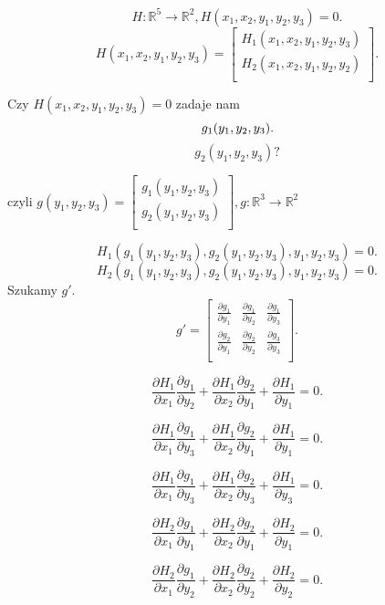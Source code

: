 \documentclass[../main.tex]{subfiles}
\begin{document}
    \[
        H: \mathbb{R}^{5}\to\mathbb{R}^{2}, H(x_{1},x_{2},y_{1},y_{2},y_{3}) = 0
    .\]
    \[
        H(x_{1},x_{2},y_{1},y_{2},y_{3}) = \begin{bmatrix}
        H_1(x_{1},x_{2},y_{1},y_{2},y_{3})\\
    H_2(x_1,x_2,y_1,y_2,y_2)\\\end{bmatrix}
    .\]
    \begin{pytanie}
        Czy $H(x_1,x_2,y_1,y_2,y_3) = 0$ zadaje nam \[
            g_1(y_1,y_2,y_3)\\
        .\]
        \[
            g_2(y_1,y_2,y_3)?
        \]
    \end{pytanie}
    czyli $g(y_1,y_2,y_3) = \begin{bmatrix}
    g_1(y_1,y_2,y_3)\\
g_2(y_1,y_2,y_3)\\\end{bmatrix}, g:\mathbb{R}^{3}\to\mathbb{R}^{2}$

\[
    H_1(g_1(y_1,y_2,y_3),g_2(y_1,y_2,y_3),y_1,y_2,y_3) = 0
.\]
\[
    H_2(g_1(y_1,y_2,y_3),g_2(y_1,y_2,y_3),y_1,y_2,y_3) = 0
.\]
Szukamy $g'$.
 \[
g' = \begin{bmatrix}
\frac{\partial g_1}{\partial y_1} & \frac{\partial g_1}{\partial y_2} &\frac{\partial g_1}{\partial y_3} \\
\frac{\partial g_2}{\partial y_1} &\frac{\partial g_2}{\partial y_2} &\frac{\partial g_3}{\partial y_3} \\\end{bmatrix}
.\]

\[
\frac{\partial H_1}{\partial x_1} \frac{\partial g_1}{\partial y_2} +\frac{\partial H_1}{\partial x_2} \frac{\partial g_2}{\partial y_1} +\frac{\partial H_1}{\partial y_1} = 0
.\]

\[
\frac{\partial H_1}{\partial x_1} \frac{\partial g_1}{\partial y_3} +\frac{\partial H_1}{\partial x_2} \frac{\partial g_2}{\partial y_1} +\frac{\partial H_1}{\partial y_1} = 0
.\]

\[
\frac{\partial H_1}{\partial x_1} \frac{\partial g_1}{\partial y_3} +\frac{\partial H_1}{\partial x_2} \frac{\partial g_2}{\partial y_3} +\frac{\partial H_1}{\partial y_3} = 0
.\]

\[
\frac{\partial H_2}{\partial x_1} \frac{\partial g_1}{\partial y_1} +\frac{\partial H_2}{\partial x_2} \frac{\partial g_2}{\partial y_1} +\frac{\partial H_2}{\partial y_1} = 0
.\]

\[
\frac{\partial H_2}{\partial x_1} \frac{\partial g_1}{\partial y_2} +\frac{\partial H_2}{\partial x_2} \frac{\partial g_2}{\partial y_2} +\frac{\partial H_2}{\partial y_2} = 0
.\]
\end{document}
